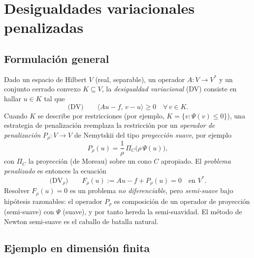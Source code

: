 \documentclass[12pt]{book}
\theoremstyle{definition}
\theoremstyle{plain}
\theoremstyle{remark}
\begin{document}
\section{Desigualdades variacionales penalizadas}\label{sec:vi}

\subsection{Formulación general}

Dado un espacio de Hilbert $V$ (real, separable), un operador
$A:V\to V^*$ y un conjunto cerrado convexo $K\subseteq V$, la
\emph{desigualdad variacional} (DV) consiste en hallar $u\in K$ tal
que
\[
  \text{(DV)}\qquad
  \langle Au-f,\, v-u\rangle \ge 0 \quad\forall\, v\in K.
\]
Cuando $K$ se describe por restricciones (por ejemplo, $K=\{v:
\Psi(v)\le0\}$), una estrategia de penalización reemplaza la
restricción por un \emph{operador de penalización}
$P_\rho:V\to V$ de Nemytskii del tipo \emph{proyección suave}, por
ejemplo
\[
  P_\rho(u)=\frac1\rho\,\Pi_C\bigl(\rho\,\Psi(u)\bigr),
\]
con $\Pi_C$ la proyección (de Moreau) sobre un cono $C$ apropiado.
El \emph{problema penalizado} es entonces la ecuación
\[
  \text{(DV$_\rho$)}\qquad
  F_\rho(u):=Au-f+P_\rho(u)=0 \quad\text{en } V^*.
\]
Resolver $F_\rho(u)=0$ es un problema \emph{no diferenciable}, pero
\emph{semi-suave} bajo hipótesis razonables: el operador $P_\rho$
es composición de un operador de proyección (semi-suave) con
$\Psi$ (suave), y por tanto hereda la semi-suavidad.  El método de
Newton semi-suave es el caballo de batalla natural.

\subsection{Ejemplo en dimensión finita}\label{sec:vi-fin}
\end{document}
